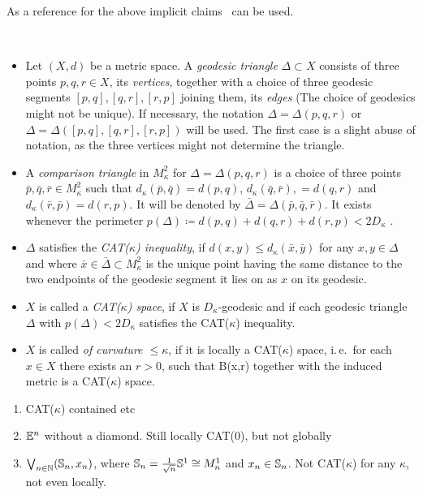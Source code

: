 \begin{rem}
  As a reference for the above implicit claims~\cite[Sec.\ I.2, I.6]{MR1744486} can be used.
\end{rem}

\begin{defin}\
  \begin{itemize}
  \item Let \((X,d)\) be a metric space. A \emph{geodesic triangle} \(\Delta \subset X\) consists of three points \(p,q,r \in X\), its \emph{vertices}, together with a choice of three geodesic segments \([p,q], [q,r], [r, p]\) joining them, its \emph{edges} (The choice of geodesics might not be unique). If necessary, the notation \(\Delta = \Delta(p,q,r)\) or \(\Delta = \Delta([p,q], [q,r], [r,p])\) will be used. The first case is a slight abuse of notation, as the three vertices might not determine the triangle.
  \item A \emph{comparison triangle} in \(M_\kappa^2\) for \(\Delta = \Delta(p,q,r)\) is a choice of three points \(\bar p, \bar q, \bar r \in M_\kappa^2\) such that \(d_\kappa(\bar p, \bar q) = d(p, q)\), \(d_\kappa(\bar q, \bar r), = d(q, r)\) and \(d_\kappa(\bar r, \bar p) = d(r, p)\). It will be denoted by \(\bar \Delta = \Delta(\bar p, \bar q, \bar r)\). It exists whenever the perimeter \(p(\Delta) \coloneqq d(p,q) + d(q,r) + d(r,p) < 2D_\kappa\) \cite[cf.][Sec.\ I.2]{MR1744486}.
  \item \(\Delta\) satisfies the \emph{CAT(\(\kappa\)) inequality}, if \(d(x,y) \leq d_\kappa(\bar x, \bar y)\) for any \(x, y \in \Delta\) and where \(\bar x \in \bar \Delta \subset M_\kappa^2\) is the unique point having the same distance to the two endpoints of the geodesic segment it lies on as \(x\) on its geodesic.
  \item \(X\) is called a \emph{CAT(\(\kappa\)) space}, if \(X\) is \(D_\kappa\)-geodesic and if each geodesic triangle \(\Delta\) with \(p(\Delta) < 2 D_\kappa\) satisfies the CAT(\(\kappa\)) inequality.
  \item \(X\) is called \emph{of curvature \(\leq \kappa\)}, if it is locally a CAT(\(\kappa\)) space, i.\,e.\ for each \(x \in X\) there exists an \(r > 0\), such that B(x,r) together with the induced metric is a CAT(\(\kappa\)) space.
  \end{itemize}
\end{defin}

\begin{bsp}
  \begin{enumerate}
  \item CAT(\(\kappa\)) contained etc
  \item \(\mathbb{E}^n\) without a diamond. Still locally CAT(0), but not globally
  \item \(\bigvee_{n \in \mathbb{N}} (\mathbb{S}_n, x_n)\), where \(\mathbb{S}_n = \frac{1}{\sqrt{n}} \mathbb{S}^1 \cong M_n^1\) and \(x_n \in \mathbb{S}_n\). Not CAT(\(\kappa\)) for any \(\kappa\), not even locally.
  \end{enumerate}
\end{bsp}

